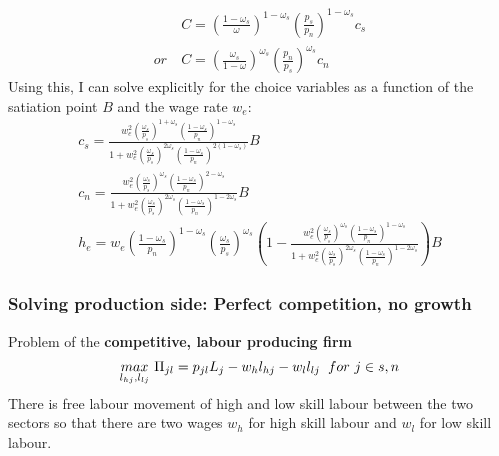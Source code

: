 \begin{align*}
&C= \left(\frac{1-\omega_s}{\omega}\right)^{1-\omega_s}\left(\frac{p_s}{p_n}\right)^{1-\omega_s}c_s\\
or\ & C= \left(\frac{\omega_s}{1-\omega}\right)^{\omega_s}\left(\frac{p_n}{p_s}\right)^{\omega_s}c_n
\end{align*} 
Using this, I can solve explicitly for the choice variables as a function of the satiation point $B$ and the wage rate $w_e$:
\begin{align}
c_s=\frac{w_e^2\left(\frac{\omega_s}{p_s}\right)^{1+\omega_s}\left(\frac{1-\omega_s}{p_n}\right)^{1-\omega_s}}{1+w_e^2\left(\frac{\omega_s}{p_s}\right)^{2\omega_s}\left(\frac{1-\omega_s}{p_n}\right)^{2(1-\omega_s)}}B\\
c_n=\frac{w_e^2\left(\frac{\omega_s}{p_s}\right)^{\omega_s}\left(\frac{1-\omega_s}{p_n}\right)^{2-\omega_s}}{1+w_e^2\left(\frac{\omega_s}{p_s}\right)^{2\omega_s}\left(\frac{1-\omega_s}{p_n}\right)^{1-2\omega_s}}B\\
h_e=w_e \left(\frac{1-\omega_s}{p_n}\right)^{1-\omega_s}\left(\frac{\omega_s}{p_s}\right)^{\omega_s}\left(1-
\frac{w_e^2\left(\frac{\omega_s}{p_s}\right)^{\omega_s}\left(\frac{1-\omega_s}{p_n}\right)^{1-\omega_s}}{1+w_e^2\left(\frac{\omega_s}{p_s}\right)^{2\omega_s}\left(\frac{1-\omega_s}{p_n}\right)^{1-2\omega_s}}\right)B
\end{align}

\subsubsection{Solving production side: Perfect competition, no growth}
Problem of the \textbf{competitive, labour producing firm}
\begin{align*}
\underset{l_{hj}, l_{lj}}{max}\  \Pi_{jl}=p_{jl}L_j-w_hl_{hj}-w_ll_{lj} \hspace{2mm} for \ j\in{s,n}
\end{align*}
There is free labour movement of high and low skill labour between the two sectors so that there are two wages $w_h$ for high skill labour and $w_l$ for low skill labour. 

